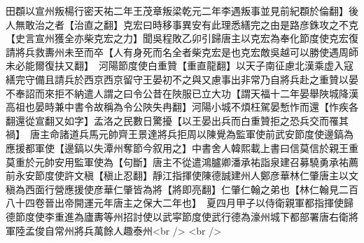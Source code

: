 田頵以宣州叛楊行密天祐二年王茂章叛梁乾元二年李遇叛事並見前紀頵於倫翻】後人無敢治之者【治直之翻】克宏曰時移事異安有此理悉繕完之由是路彦銖攻之不克【史言宣州獲全亦柴克宏之力】聞吳程敗乙卯引歸唐主以克宏為奉化節度使克宏復請將兵救夀州未至而卒【人有身死而名全者柴克宏是也克宏敵吳越可以勝使遇周師未必能爾復扶又翻】　河陽節度使白重贊【重直龍翻】以天子南征慮北漢乘虚入寇繕完守備且請兵於西京西京留守王晏初不之與又慮事出非常乃自將兵赴之重贊以晏不奉詔而來拒不納遣人謂之曰令公昔在陜服已立大功【謂天福十二年晏舉陜城降漢高祖也晏時兼中書令故稱為令公陜失冉翻】河陽小城不煩枉駕晏慙怍而還【怍疾各翻還從宣翻又如字】孟洛之民數日驚擾【以王晏出兵而白重贊拒之恐兵交而罹其禍】　唐主命諸道兵馬元帥齊王景達將兵拒周以陳覺為監軍使前武安節度使邊鎬為應援都軍使【邊鎬以失潭州奪節今叙用之】中書舍人韓熙載上書曰信莫信於親王重莫重於元帥安用監軍使為【句斷】唐主不從遣鴻臚卿潘承祐詣泉建召募驍勇承祐薦前永安節度使許文稹【稹止忍翻】靜江指揮使陳德誠建州人鄭彦華林仁肇唐主以文稹為西面行營應援使彦華仁肇皆為將【將即亮翻】仁肇仁翰之弟也【林仁翰見二百八十四卷晉出帝開運元年唐主之保大二年也】　夏四月甲子以侍衛親軍都指揮使歸德節度使李重進為廬夀等州招討使以武寜節度使武行德為濠州城下都部署唐右衛將軍陸孟俊自常州將兵萬餘人趣泰州<br />
<br />

